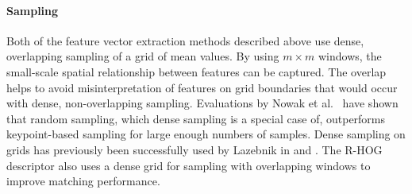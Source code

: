 \paragraph{Sampling}

Both of the feature vector extraction methods described above use dense,
overlapping sampling of a grid of mean values. By using $m \times m$ windows,
the small-scale spatial relationship between features can be captured. The
overlap helps to avoid misinterpretation of features on grid boundaries that
would occur with dense, non-overlapping sampling. Evaluations by Nowak et al.\
\autocite{nowak_sampling_2006} have shown that random sampling, which dense
sampling is a special case of, outperforms keypoint-based sampling for large
enough numbers of samples. Dense sampling on grids has previously been
successfully used by Lazebnik in \autocite{lazebnik_beyond_2006} and
\autocite{lazebnik_spatial_2009}. The R-HOG descriptor
\autocite{dalal_histograms_2005} also uses a dense grid for sampling with
overlapping windows to improve matching performance.
